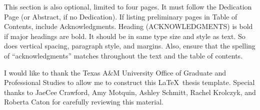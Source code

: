 %
%
%


\begin{acknowledgements}

This section is also optional, limited to four pages. It must follow the Dedication Page (or Abstract, if no Dedication). If listing preliminary pages in Table of Contents, include Acknowledgments. Heading (\MakeUppercase{Acknowledgments}) is bold if major headings are bold. It should be in same type size and style as text. So does vertical spacing, paragraph style, and margins. Also, ensure that the spelling of ``acknowledgments'' matches throughout the text and the table of contents.

I would like to thank the Texas A\&M University Office of Graduate and Professional Studies to allow me to construct this \LaTeX\ thesis template. Special thanks to JaeCee Crawford, Amy Motquin, Ashley Schmitt, Rachel Krolczyk, and Roberta Caton for carefully reviewing this material.  %

\end{acknowledgements}